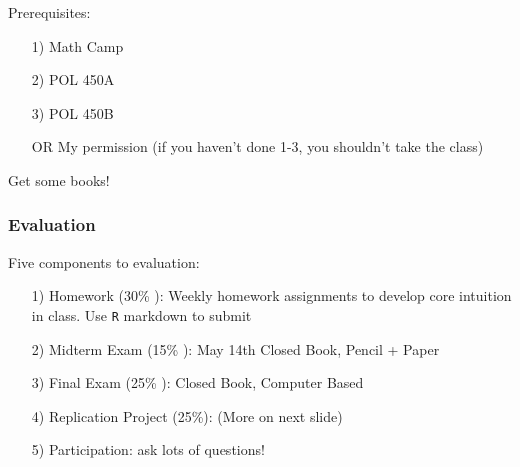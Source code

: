 \documentclass{beamer}
\begin{document}
\begin{frame}
Prerequisites:
\begin{itemize}
\item[1)] Math Camp
\item[2)] POL 450A
\item[3)] POL 450B
\item[OR] My permission  (if you haven't done 1-3, you shouldn't take the class)
\end{itemize}

Get some books!
\end{frame}



\begin{frame}
\frametitle{Evaluation}
Five components to evaluation:

\begin{itemize}
\item[1)] Homework (30\% ): Weekly homework assignments to develop core intuition in class.  Use {\tt R} markdown to submit
\item[2)] Midterm Exam (15\% ): \alert{May 14th} Closed Book, Pencil + Paper
\item[3)] Final Exam (25\% ): Closed Book, Computer Based
\item[4)] Replication Project (25\%): (More on next slide)
\item[5)] Participation: ask lots of questions! 
\end{itemize}


\end{frame}
\end{document}
